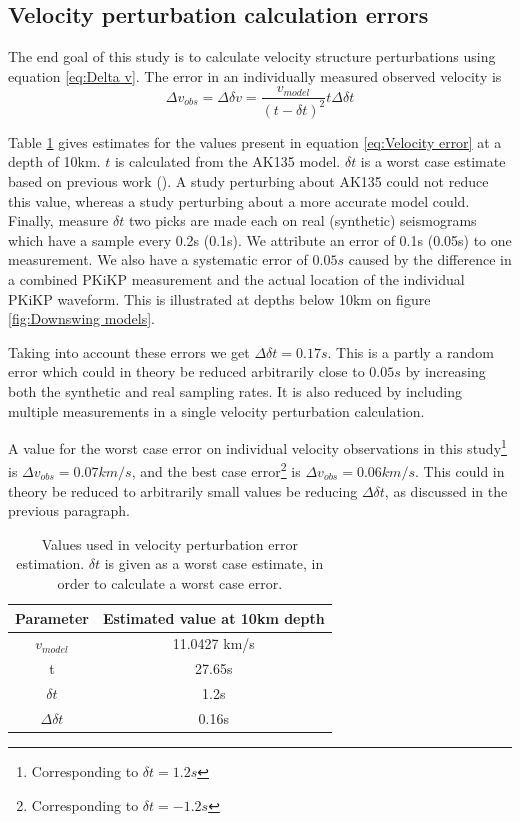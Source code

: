 \documentclass[11pt,a4paper]{article}
\begin{document}
\subsection{Velocity perturbation calculation errors}
The end goal of this study is to calculate velocity structure perturbations using equation \eqref{eq:Delta v}. The error in an individually measured observed velocity is
\begin{equation}
	\Delta v_{obs} = \Delta \delta v = \frac{v_{model}}{\left( t - \delta t\right )^{2}} t\Delta \delta t 
	\label{eq:Velocity error}
\end{equation}

Table \ref{tab:Error values} gives estimates for the values present in equation \eqref{eq:Velocity error} at a depth of 10km. $t$ is calculated from the AK135 model. $\delta t$ is a worst case estimate based on previous work (\cite{Waszek2011a}). A study perturbing about AK135 could not reduce this value, whereas a study perturbing about a more accurate model could. Finally, measure $\delta t$ two picks are made each on real (synthetic) seismograms which have a sample every 0.2s (0.1s). We attribute an error of 0.1s (0.05s) to one measurement. We also have a systematic error of $0.05s$ caused by the difference in a combined PKiKP measurement and the actual location of the individual PKiKP waveform. This is illustrated at depths below 10km on figure \ref{fig:Downswing models}.

Taking into account these errors we get $\Delta \delta t = 0.17s$. This is a partly a random error which could in theory be reduced arbitrarily close to $0.05s$ by increasing both the synthetic and real sampling rates. It is also reduced by including multiple measurements in a single velocity perturbation calculation.

A value for the worst case error on individual velocity observations in this study\footnote{Corresponding to $\delta t = 1.2s$} is $\Delta v_{obs} = 0.07 km/s$, and the best case error\footnote{Corresponding to $\delta t = -1.2s$} is $\Delta v_{obs} = 0.06 km/s$. This could in theory be reduced to arbitrarily small values be reducing $\Delta \delta t$, as discussed in the previous paragraph.

\begin{table}
\centering
\begin{tabular}{| c | c |}
	\hline
	Parameter		& Estimated value at 10km depth	\\ \hline \hline
	$v_{model}$	& 11.0427 km/s					\\ \hline
	t			& 27.65s						\\ \hline
	$\delta t$		& 1.2s						\\ \hline
	$\Delta \delta t$	& 0.16s						\\				
	\hline
\end{tabular}
\caption{Values used in velocity perturbation error estimation. $\delta t$ is given as a worst case estimate, in order to calculate a worst case error.}
\label{tab:Error values}
\end{table}
\end{document}
